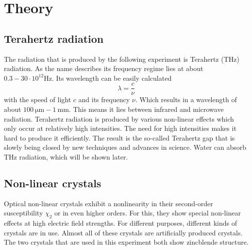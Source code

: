 \chapter{Theory}
\section{Terahertz radiation}
The radiation that is produced by the following experiment is Terahertz ($\si{\tera\hertz}$) radiation.
As the name describes its frequency regime lies at about $0.3-30\cdot10^{12}\si{\hertz}$.
Its wavelength can be easily calculated
\begin{equation}
    \lambda = \frac{c}{\nu}
\end{equation}
with the speed of light $c$ and its frequency $\nu$.
Which results in a wavelength of about $\SI{100}{\micro\meter}-\SI{1}{\milli\meter}$.
This means it lies between infrared and microwave radiation.
Terahertz radiation is produced by various non-linear effects which only occur at relatively high intensities.
The need for high intensities makes it hard to produce it efficiently.
The result is the so-called Terahertz gap that is slowly being closed by new techniques and advances in science.
Water can absorb $\si{\tera\hertz}$ radiation, which will be shown later.


\section{Non-linear crystals}
Optical non-linear crystals exhibit a nonlinearity in their second-order susceptibility $\chi_2$ or in even higher orders.
For this, they show special non-linear effects at high electric field strengths.
For different purposes, different kinds of crystals are in use.
Almost all of these crystals are artificially produced crystals.
The two crystals that are used in this experiment both show zincblende structure.


